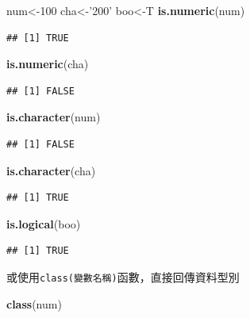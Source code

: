 \documentclass[]{book}
\newenvironment{Shaded}{\begin{snugshade}}{\end{snugshade}}
\newcommand{\KeywordTok}[1]{\textcolor[rgb]{0.13,0.29,0.53}{\textbf{{#1}}}}
\newcommand{\DecValTok}[1]{\textcolor[rgb]{0.00,0.00,0.81}{{#1}}}
\newcommand{\StringTok}[1]{\textcolor[rgb]{0.31,0.60,0.02}{{#1}}}
\newcommand{\NormalTok}[1]{{#1}}
\theoremstyle{definition}
\theoremstyle{definition}
\theoremstyle{remark}
\begin{document}
\begin{Shaded}
\begin{Highlighting}[]
\NormalTok{num<-}\DecValTok{100}
\NormalTok{cha<-}\StringTok{'200'}
\NormalTok{boo<-T}
\KeywordTok{is.numeric}\NormalTok{(num)}
\end{Highlighting}
\end{Shaded}

\begin{verbatim}
## [1] TRUE
\end{verbatim}

\begin{Shaded}
\begin{Highlighting}[]
\KeywordTok{is.numeric}\NormalTok{(cha)}
\end{Highlighting}
\end{Shaded}

\begin{verbatim}
## [1] FALSE
\end{verbatim}

\begin{Shaded}
\begin{Highlighting}[]
\KeywordTok{is.character}\NormalTok{(num)}
\end{Highlighting}
\end{Shaded}

\begin{verbatim}
## [1] FALSE
\end{verbatim}

\begin{Shaded}
\begin{Highlighting}[]
\KeywordTok{is.character}\NormalTok{(cha)}
\end{Highlighting}
\end{Shaded}

\begin{verbatim}
## [1] TRUE
\end{verbatim}

\begin{Shaded}
\begin{Highlighting}[]
\KeywordTok{is.logical}\NormalTok{(boo)}
\end{Highlighting}
\end{Shaded}

\begin{verbatim}
## [1] TRUE
\end{verbatim}

或使用\texttt{class(變數名稱)}函數，直接回傳資料型別

\begin{Shaded}
\begin{Highlighting}[]
\KeywordTok{class}\NormalTok{(num)}
\end{Highlighting}
\end{Shaded}
\end{document}
